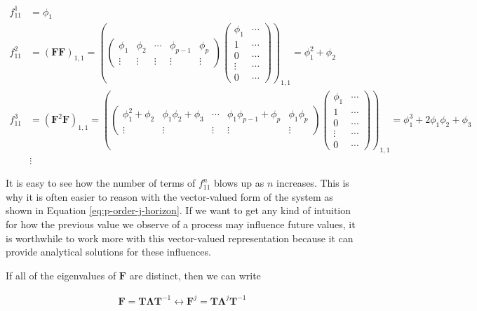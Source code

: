 \documentclass{tufte-book}
\begin{document}
\begin{align*}
f_{11}^1 &= \phi_1 \\
f_{11}^2 &= (\bm{F} \bm{F})_{1,1} = \left( \begin{pmatrix}
\phi_1  & \phi_2    & \cdots    & \phi_{p-1}    & \phi_p    \\
\vdots       & \vdots         & \vdots    & \vdots         & \vdots
\end{pmatrix} \begin{pmatrix}
\phi_1  & \cdots \\
1       & \cdots      \\
0       & \cdots      \\
\vdots  & \cdots \\
0       & \cdots      
\end{pmatrix} \right)_{1,1} = \phi_1^2 + \phi_2 \\
f_{11}^3 &= (\bm{F}^2 \bm{F})_{1,1} = \left( \begin{pmatrix}
\phi_1^2 + \phi_2  & \phi_1 \phi_2 + \phi_3    & \cdots    & \phi_1 \phi_{p-1} + \phi_p    & \phi_1 \phi_p    \\
\vdots       & \vdots         & \vdots    & \vdots         & \vdots
\end{pmatrix} \begin{pmatrix}
\phi_1  & \cdots \\
1       & \cdots      \\
0       & \cdots      \\
\vdots  & \cdots \\
0       & \cdots      
\end{pmatrix} \right)_{1,1} = \phi_1^3 + 2\phi_1\phi_2 + \phi_3 \\
&\vdots
\end{align*}


It is easy to see how the number of terms of $f_{11}^n$ blows up as $n$ increases. This is why it is often easier to reason with the vector-valued form of the system as shown in Equation \ref{eq:p-order-j-horizon}. If we want to get any kind of intuition for how the previous value we observe of a process may influence future values, it is worthwhile to work more with this vector-valued representation because it can provide analytical solutions for these influences.

If all of the eigenvalues of $\bm{F}$ are distinct, then we can write

\begin{align*}
\bm{F} = \bm{T} \bm{\Lambda} \bm{T}^{-1} \leftrightarrow \bm{F}^j = \bm{T} \bm{\Lambda}^j \bm{T}^{-1}
\end{align*}
\end{document}
